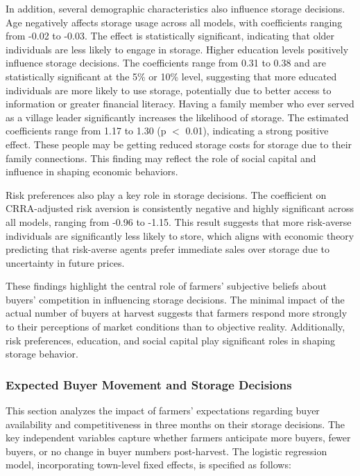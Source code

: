 \documentclass[12pt]{article}
\begin{document}
In addition, several demographic characteristics also influence storage decisions. Age negatively affects storage usage across all models, with coefficients ranging from -0.02 to -0.03. The effect is statistically significant, indicating that older individuals are less likely to engage in storage. Higher education levels positively influence storage decisions. The coefficients range from 0.31 to 0.38 and are statistically significant at the 5\% or 10\% level, suggesting that more educated individuals are more likely to use storage, potentially due to better access to information or greater financial literacy. Having a family member who ever served as a village leader significantly increases the likelihood of storage. The estimated coefficients range from 1.17 to 1.30 (p $<$ 0.01), indicating a strong positive effect. These people may be getting reduced storage costs for storage due to their family connections. This finding may reflect the role of social capital and influence in shaping economic behaviors.

Risk preferences also play a key role in storage decisions. The coefficient on CRRA-adjusted risk aversion is consistently negative and highly significant across all models, ranging from -0.96 to -1.15. This result suggests that more risk-averse individuals are significantly less likely to store, which aligns with economic theory predicting that risk-averse agents prefer immediate sales over storage due to uncertainty in future prices.

These findings highlight the central role of farmers' subjective beliefs about buyers' competition in influencing storage decisions. The minimal impact of the actual number of buyers at harvest suggests that farmers respond more strongly to their perceptions of market conditions than to objective reality. Additionally, risk preferences, education, and social capital play significant roles in shaping storage behavior.



\subsubsection{Expected Buyer Movement and Storage Decisions}

\noindent This section analyzes the impact of farmers' expectations regarding buyer availability and competitiveness in three months on their storage decisions. The key independent variables capture whether farmers anticipate more buyers, fewer buyers, or no change in buyer numbers post-harvest. The logistic regression model, incorporating town-level fixed effects, is specified as follows:
\end{document}
